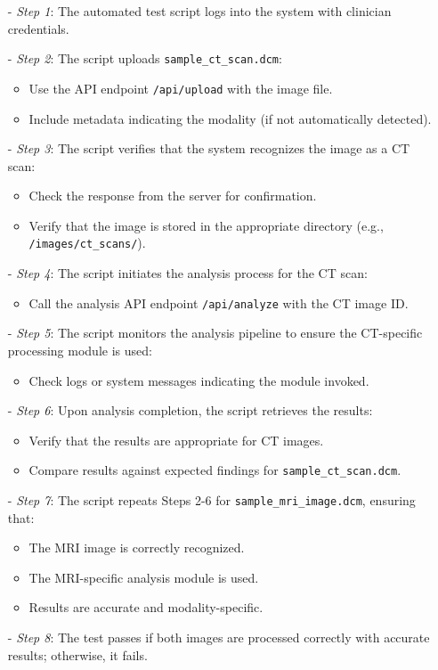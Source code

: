 \documentclass[12pt, titlepage]{article}
\begin{document}
\begin{enumerate}
\begin{itemize}
  \item[-] \textit{Step 1}: The automated test script logs into the system with clinician credentials.
  \item[-] \textit{Step 2}: The script uploads \texttt{sample\_ct\_scan.dcm}:
    \begin{itemize}
      \item Use the API endpoint \texttt{/api/upload} with the image file.
      \item Include metadata indicating the modality (if not automatically detected).
    \end{itemize}
  \item[-] \textit{Step 3}: The script verifies that the system recognizes the image as a CT scan:
    \begin{itemize}
      \item Check the response from the server for confirmation.
      \item Verify that the image is stored in the appropriate directory (e.g., \texttt{/images/ct\_scans/}).
    \end{itemize}
  \item[-] \textit{Step 4}: The script initiates the analysis process for the CT scan:
    \begin{itemize}
      \item Call the analysis API endpoint \texttt{/api/analyze} with the CT image ID.
    \end{itemize}
  \item[-] \textit{Step 5}: The script monitors the analysis pipeline to ensure the CT-specific processing module is used:
    \begin{itemize}
      \item Check logs or system messages indicating the module invoked.
    \end{itemize}
  \item[-] \textit{Step 6}: Upon analysis completion, the script retrieves the results:
    \begin{itemize}
      \item Verify that the results are appropriate for CT images.
      \item Compare results against expected findings for \texttt{sample\_ct\_scan.dcm}.
    \end{itemize}
  \item[-] \textit{Step 7}: The script repeats Steps 2-6 for \texttt{sample\_mri\_image.dcm}, ensuring that:
    \begin{itemize}
      \item The MRI image is correctly recognized.
      \item The MRI-specific analysis module is used.
      \item Results are accurate and modality-specific.
    \end{itemize}
  \item[-] \textit{Step 8}: The test passes if both images are processed correctly with accurate results; otherwise, it fails.
\end{itemize}

\end{enumerate}
\end{document}
